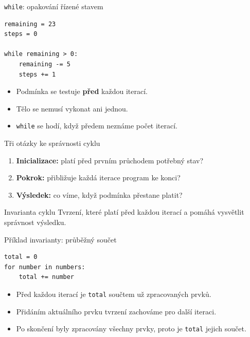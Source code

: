 \documentclass[aspectratio=169,t]{beamer}
\begin{document}
\begin{frame}[fragile]{\texttt{while}: opakování řízené stavem}
\begin{lstlisting}[style=python]
remaining = 23
steps = 0

while remaining > 0:
    remaining -= 5
    steps += 1
\end{lstlisting}
  \begin{itemize}
    \item Podmínka se testuje \textbf{před} každou iterací.
    \item Tělo se nemusí vykonat ani jednou.
    \item \texttt{while} se hodí, když předem neznáme počet iterací.
  \end{itemize}
\end{frame}

\begin{frame}{Tři otázky ke správnosti cyklu}
  \begin{enumerate}
    \item \textbf{Inicializace:} platí před prvním průchodem potřebný stav?
    \item \textbf{Pokrok:} přibližuje každá iterace program ke konci?
    \item \textbf{Výsledek:} co víme, když podmínka přestane platit?
  \end{enumerate}
  \begin{block}{Invarianta cyklu}
    Tvrzení, které platí před každou iterací a pomáhá vysvětlit správnost výsledku.
  \end{block}
\end{frame}

\begin{frame}[fragile]{Příklad invarianty: průběžný součet}
\begin{lstlisting}[style=python]
total = 0
for number in numbers:
    total += number
\end{lstlisting}
  \begin{itemize}
    \item Před každou iterací je \texttt{total} součtem už zpracovaných prvků.
    \item Přidáním aktuálního prvku tvrzení zachováme pro další iteraci.
    \item Po skončení byly zpracovány všechny prvky, proto je \texttt{total} jejich součet.
  \end{itemize}
\end{frame}
\end{document}
